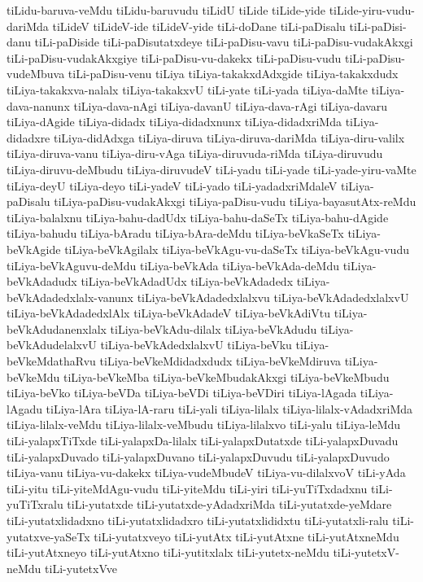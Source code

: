 {tiLidu-baruva-veMdu
tiLidu-baruvudu
tiLidU
tiLide
tiLide-yide
tiLide-yiru-vudu-dariMda
tiLideV
tiLideV-ide
tiLideV-yide
tiLi-doDane
tiLi-paDisalu
tiLi-paDisi-danu
tiLi-paDiside
tiLi-paDisutatxdeye
tiLi-paDisu-vavu
tiLi-paDisu-vudakAkxgi
tiLi-paDisu-vudakAkxgiye
tiLi-paDisu-vu-dakekx
tiLi-paDisu-vudu
tiLi-paDisu-vudeMbuva
tiLi-paDisu-venu
tiLiya
tiLiya-takakxdAdxgide
tiLiya-takakxdudx
tiLiya-takakxva-nalalx
tiLiya-takakxvU
tiLi-yate
tiLi-yada
tiLiya-daMte
tiLiya-dava-nanunx
tiLiya-dava-nAgi
tiLiya-davanU
tiLiya-dava-rAgi
tiLiya-davaru
tiLiya-dAgide
tiLiya-didadx
tiLiya-didadxnunx
tiLiya-didadxriMda
tiLiya-didadxre
tiLiya-didAdxga
tiLiya-diruva
tiLiya-diruva-dariMda
tiLiya-diru-valilx
tiLiya-diruva-vanu
tiLiya-diru-vAga
tiLiya-diruvuda-riMda
tiLiya-diruvudu
tiLiya-diruvu-deMbudu
tiLiya-diruvudeV
tiLi-yadu
tiLi-yade
tiLi-yade-yiru-vaMte
tiLiya-deyU
tiLiya-deyo
tiLi-yadeV
tiLi-yado
tiLi-yadadxriMdaleV
tiLiya-paDisalu
tiLiya-paDisu-vudakAkxgi
tiLiya-paDisu-vudu
tiLiya-bayasutAtx-reMdu
tiLiya-balalxnu
tiLiya-bahu-dadUdx
tiLiya-bahu-daSeTx
tiLiya-bahu-dAgide
tiLiya-bahudu
tiLiya-bAradu
tiLiya-bAra-deMdu
tiLiya-beVkaSeTx
tiLiya-beVkAgide
tiLiya-beVkAgilalx
tiLiya-beVkAgu-vu-daSeTx
tiLiya-beVkAgu-vudu
tiLiya-beVkAguvu-deMdu
tiLiya-beVkAda
tiLiya-beVkAda-deMdu
tiLiya-beVkAdadudx
tiLiya-beVkAdadUdx
tiLiya-beVkAdadedx
tiLiya-beVkAdadedxlalx-vanunx
tiLiya-beVkAdadedxlalxvu
tiLiya-beVkAdadedxlalxvU
tiLiya-beVkAdadedxlAlx
tiLiya-beVkAdadeV
tiLiya-beVkAdiVtu
tiLiya-beVkAdudanenxlalx
tiLiya-beVkAdu-dilalx
tiLiya-beVkAdudu
tiLiya-beVkAdudelalxvU
tiLiya-beVkAdedxlalxvU
tiLiya-beVku
tiLiya-beVkeMdathaRvu
tiLiya-beVkeMdidadxdudx
tiLiya-beVkeMdiruva
tiLiya-beVkeMdu
tiLiya-beVkeMba
tiLiya-beVkeMbudakAkxgi
tiLiya-beVkeMbudu
tiLiya-beVko
tiLiya-beVDa
tiLiya-beVDi
tiLiya-beVDiri
tiLiya-lAgada
tiLiya-lAgadu
tiLiya-lAra
tiLiya-lA-raru
tiLi-yali
tiLiya-lilalx
tiLiya-lilalx-vAdadxriMda
tiLiya-lilalx-veMdu
tiLiya-lilalx-veMbudu
tiLiya-lilalxvo
tiLi-yalu
tiLiya-leMdu
tiLi-yalapxTiTxde
tiLi-yalapxDa-lilalx
tiLi-yalapxDutatxde
tiLi-yalapxDuvadu
tiLi-yalapxDuvado
tiLi-yalapxDuvano
tiLi-yalapxDuvudu
tiLi-yalapxDuvudo
tiLiya-vanu
tiLiya-vu-dakekx
tiLiya-vudeMbudeV
tiLiya-vu-dilalxvoV
tiLi-yAda
tiLi-yitu
tiLi-yiteMdAgu-vudu
tiLi-yiteMdu
tiLi-yiri
tiLi-yuTiTxdadxnu
tiLi-yuTiTxralu
tiLi-yutatxde
tiLi-yutatxde-yAdadxriMda
tiLi-yutatxde-yeMdare
tiLi-yutatxlidadxno
tiLi-yutatxlidadxro
tiLi-yutatxlididxtu
tiLi-yutatxli-ralu
tiLi-yutatxve-yaSeTx
tiLi-yutatxveyo
tiLi-yutAtx
tiLi-yutAtxne
tiLi-yutAtxneMdu
tiLi-yutAtxneyo
tiLi-yutAtxno
tiLi-yutitxlalx
tiLi-yutetx-neMdu
tiLi-yutetxV-neMdu
tiLi-yutetxVve
}
